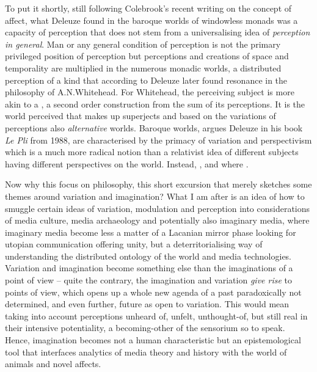 {To put it shortly, still following Colebrook's recent writing on the
concept of affect, what Deleuze found in the baroque worlds of
windowless monads was a capacity of perception that does not stem from
a universalising idea of {\em perception in general}. Man or any
general condition of perception is not the primary privileged position
of perception but perceptions and creations of space and temporality
are multiplied in the numerous monadic worlds, a distributed perception
of a kind that according to Deleuze later found resonance in the
philosophy of A.N.Whitehead. For Whitehead, the perceiving subject is
more akin to a , a second order construction from the sum of
its perceptions. It is the world perceived that makes up superjects and
based on the variations of perceptions also {\em alternative}
worlds. Baroque worlds, argues Deleuze in his book {\em Le Pli} from
1988, are characterised by the primacy of variation and perspectivism
which is a much more radical notion than a relativist idea of different
subjects having different perspectives on the world. Instead, , and where .

Now why this focus on philosophy, this short excursion that merely
sketches some themes around variation and imagination? What I am after
is an idea of how to smuggle certain ideas of variation, modulation and
perception into considerations of media culture, media archaeology and
potentially also imaginary media, where imaginary media become less a
matter of a Lacanian mirror phase looking for utopian communication
offering unity, but a deterritorialising way of understanding the
distributed ontology of the world and media technologies. Variation and
imagination become something else than the imaginations of a point of
view {--} quite the contrary, the imagination and variation
{\em give rise} to points of view, which opens up a whole new agenda
of a past paradoxically not determined, and even further, future as
open to variation. This would mean taking into account perceptions
unheard of, unfelt, unthought{}-of, but still real in their intensive
potentiality, a becoming{}-other of the sensorium so to speak. Hence,
imagination becomes not a human characteristic but an epistemological
tool that interfaces analytics of media theory and history with the
world of animals and novel affects.

}
